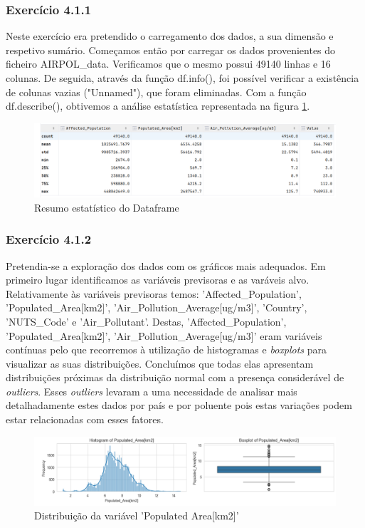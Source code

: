 \documentclass[conference]{IEEEtran}
\begin{document}
\subsubsection{\textbf{Exercício 4.1.1}}

Neste exercício era pretendido o carregamento dos dados, a sua dimensão e respetivo sumário. 
Começamos então por carregar os dados provenientes do ficheiro AIRPOL\_data. Verificamos que o mesmo possui 49140 linhas e 16 colunas. De seguida, através da função df.info(), foi possível verificar a existência de colunas vazias ("Unnamed"), que foram eliminadas. Com a função df.describe(), obtivemos a análise estatística representada na figura \ref{fig:Statistics}.

\begin{figure}[H]
	\centering
	\includegraphics[width=1\linewidth]{statistics}
	\caption{Resumo estatístico do Dataframe}
	\label{fig:Statistics}
\end{figure}


\medskip
\subsubsection{\textbf{Exercício 4.1.2}}

Pretendia-se a exploração dos dados com os gráficos mais adequados. Em primeiro lugar identificamos as variáveis previsoras e as varáveis alvo. Relativamente às variáveis previsoras temos: 'Affected\_Population', 'Populated\_Area[km2]', 'Air\_Pollution\_Average[ug/m3]', 'Country', 'NUTS\_Code' e 'Air\_Pollutant'. Destas, 'Affected\_Population', 'Populated\_Area[km2]', 'Air\_Pollution\_Average[ug/m3]' eram variáveis contínuas pelo que recorremos à utilização de histogramas e \textit{boxplots} para visualizar as suas distribuições. Concluímos que todas elas apresentam distribuições próximas da distribuição normal com a presença considerável de \textit{outliers}. Esses \textit{outliers} levaram a uma necessidade de analisar mais detalhadamente estes dados por país e por poluente pois estas variações podem estar relacionadas com esses fatores. 

\begin{figure}[H]
	\centering
	\includegraphics[width=1\linewidth]{PopArea}
	\caption{Distribuição da variável 'Populated Area[km2]'}
	\label{fig:PopArea}
\end{figure}
\end{document}
